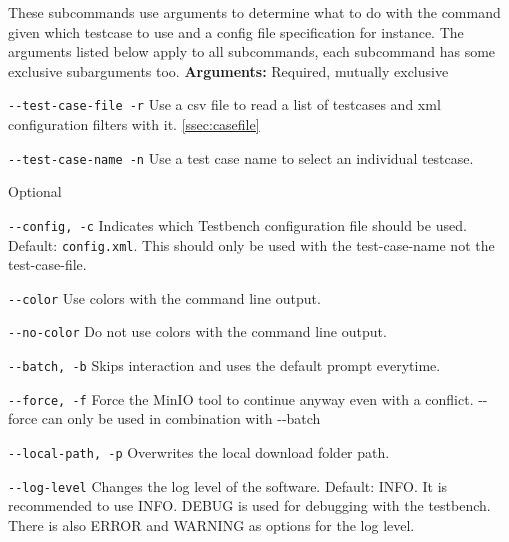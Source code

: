 \documentclass{deltares_memo}
\begin{document}
These subcommands use arguments to determine what to do with the command given which testcase to use and a config file specification for instance.
The arguments listed below apply to all subcommands, each subcommand has some exclusive subarguments too.
\newline
\newline
\textbf{Arguments:}
\newline
Required, mutually exclusive
\begin{guilist}
	\item[\texttt{-{}-test-case-file -r}] Use a csv file to read a list of testcases and xml configuration filters with it. \autoref{ssec:casefile}
	\item[\texttt{-{}-test-case-name -n}] Use a test case name to select an individual testcase.
	\newline
\end{guilist}
Optional
\begin{guilist}
	\item[\texttt{-{}-config, -c}] Indicates which Testbench configuration file should be used. Default: \texttt{config.xml}. This should only be used with the test-case-name not the test-case-file.
	\item[\texttt{-{}-color}] Use colors with the command line output.
	\item[\texttt{-{}-no-color}] Do not use colors with the command line output.
	\item[\texttt{-{}-batch, -b}] Skips interaction and uses the default prompt everytime.
	\item[\texttt{-{}-force, -f}] Force the MinIO tool to continue anyway even with a conflict. -{}-force can only be used in combination with -{}-batch
	\item[\texttt{-{}-local-path, -p}] Overwrites the local download folder path.
	\item[\texttt{-{}-log-level}] Changes the log level of the software. Default: INFO. It is recommended to use INFO. DEBUG is used for debugging with the testbench. There is also ERROR and WARNING as options for the log level.
\end{guilist}
\end{document}
